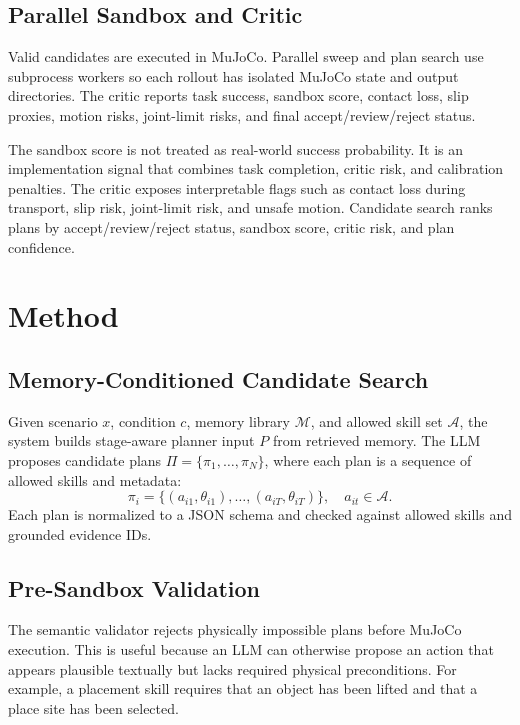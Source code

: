 \documentclass[conference]{IEEEtran}
\begin{document}
\subsection{Parallel Sandbox and Critic}
Valid candidates are executed in MuJoCo. Parallel sweep and plan search use subprocess workers so each rollout has isolated MuJoCo state and output directories. The critic reports task success, sandbox score, contact loss, slip proxies, motion risks, joint-limit risks, and final accept/review/reject status.

The sandbox score is not treated as real-world success probability. It is an implementation signal that combines task completion, critic risk, and calibration penalties. The critic exposes interpretable flags such as contact loss during transport, slip risk, joint-limit risk, and unsafe motion. Candidate search ranks plans by accept/review/reject status, sandbox score, critic risk, and plan confidence.

\section{Method}
\subsection{Memory-Conditioned Candidate Search}
Given scenario $x$, condition $c$, memory library $\mathcal{M}$, and allowed skill set $\mathcal{A}$, the system builds stage-aware planner input $P$ from retrieved memory. The LLM proposes candidate plans $\Pi = \{\pi_1,\ldots,\pi_N\}$, where each plan is a sequence of allowed skills and metadata:
\begin{equation}
\pi_i = \{(a_{i1}, \theta_{i1}), \ldots, (a_{iT}, \theta_{iT})\}, \quad a_{it}\in\mathcal{A}.
\end{equation}
Each plan is normalized to a JSON schema and checked against allowed skills and grounded evidence IDs.

\subsection{Pre-Sandbox Validation}
The semantic validator rejects physically impossible plans before MuJoCo execution. This is useful because an LLM can otherwise propose an action that appears plausible textually but lacks required physical preconditions. For example, a placement skill requires that an object has been lifted and that a place site has been selected.
\end{document}
